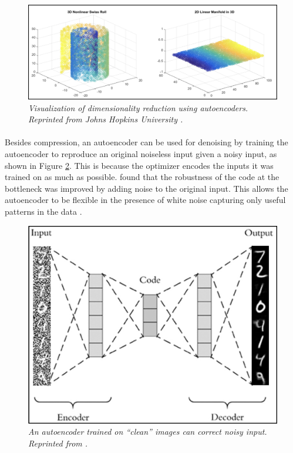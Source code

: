 \begin{figure}[H]
  \centering
  \caption[Visualization of dimensionality reduction using autoencoders.]{\emph{Visualization of dimensionality reduction using autoencoders. \\ 
  Reprinted from Johns Hopkins University \citeyear{johns_hopkins_university_2015}.}}\label{fig:ae_f_reduction}
  \includegraphics[scale = 0.2]{figures/ae_f_reduction.jpg}  
\end{figure}

\paragraph{}
Besides compression, an autoencoder can be used for denoising by training the autoencoder to reproduce an original noiseless input given a noisy input, as shown in Figure \ref{fig:ae_2}. This is because the optimizer encodes the inputs it was trained on as much as possible. \citeauthor{vincent_larochelle_bengio_manzagol_2008} \citeyear{vincent_larochelle_bengio_manzagol_2008} found that the robustness of the code at the bottleneck was improved by adding noise to the original input. This allows the autoencoder to be flexible in the presence of white noise capturing only useful patterns in the data \cite{vincent10a}.


\begin{figure}[H]
  \centering
  \caption[An autoencoder trained on "clean" images can correct noisy input.]{\emph{An autoencoder trained on ``clean'' images can correct noisy input. \\
  Reprinted from \citeauthor{rosebrock_2020} \citeyear{rosebrock_2020}.}}\label{fig:ae_2}
  \includegraphics[scale = 0.4]{figures/ae_2.jpg}  
\end{figure}

